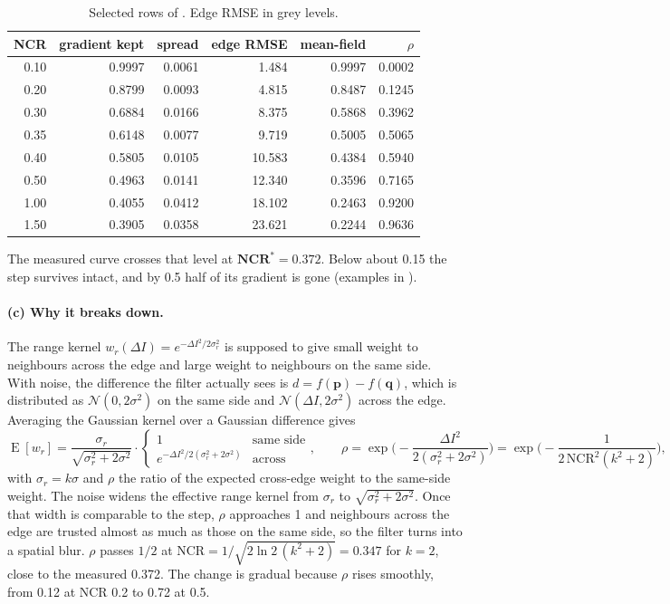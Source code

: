 \begin{table}[H]
\centering
\begin{tabular}{rrrrrr}
\toprule
NCR & gradient kept & spread & edge RMSE & mean-field & $\rho$\\
\midrule
0.10 & 0.9997 & 0.0061 & 1.484 & 0.9997 & 0.0002\\
0.20 & 0.8799 & 0.0093 & 4.815 & 0.8487 & 0.1245\\
0.30 & 0.6884 & 0.0166 & 8.375 & 0.5868 & 0.3962\\
0.35 & 0.6148 & 0.0077 & 9.719 & 0.5005 & 0.5065\\
0.40 & 0.5805 & 0.0105 & 10.583 & 0.4384 & 0.5940\\
0.50 & 0.4963 & 0.0141 & 12.340 & 0.3596 & 0.7165\\
1.00 & 0.4055 & 0.0412 & 18.102 & 0.2463 & 0.9200\\
1.50 & 0.3905 & 0.0358 & 23.621 & 0.2244 & 0.9636\\
\bottomrule
\end{tabular}
\caption{Selected rows of . Edge RMSE in grey levels.}
\label{tab:ncr}
\end{table}

The measured curve crosses that level at $\textbf{NCR}^*\mathbf{=0.372}$. Below
about 0.15 the step survives intact, and by 0.5 half of its gradient is gone
(examples in ).

\paragraph{(c) Why it breaks down.} The range kernel
$w_r(\Delta I)=e^{-\Delta I^2/2\sigma_r^2}$ is supposed to give small weight to
neighbours across the edge and large weight to neighbours on the same side. With
noise, the difference the filter actually sees is $d=f(\mathbf p)-f(\mathbf q)$,
which is distributed as $\mathcal N(0,2\sigma^2)$ on the same side and
$\mathcal N(\Delta I,2\sigma^2)$ across the edge. Averaging the Gaussian kernel
over a Gaussian difference gives
\begin{equation}
\operatorname{E}[w_r]=\frac{\sigma_r}{\sqrt{\sigma_r^2+2\sigma^2}}\cdot
\begin{cases}1&\text{same side}\\ e^{-\Delta I^2/2(\sigma_r^2+2\sigma^2)}&\text{across}\end{cases},
\qquad
\rho=\exp\!\Big(-\frac{\Delta I^2}{2(\sigma_r^2+2\sigma^2)}\Big)=\exp\!\Big(-\frac{1}{2\,\text{NCR}^2(k^2+2)}\Big),
\end{equation}
with $\sigma_r=k\sigma$ and $\rho$ the ratio of the expected cross-edge weight to
the same-side weight. The noise widens the effective range kernel from $\sigma_r$
to $\sqrt{\sigma_r^2+2\sigma^2}$. Once that width is comparable to the step,
$\rho$ approaches 1 and neighbours across the edge are trusted almost as much as
those on the same side, so the filter turns into a spatial blur. $\rho$ passes
$1/2$ at $\text{NCR}=1/\sqrt{2\ln2\,(k^2+2)}=0.347$ for $k=2$, close to the
measured 0.372. The change is gradual because $\rho$ rises smoothly, from 0.12 at
NCR 0.2 to 0.72 at 0.5.

